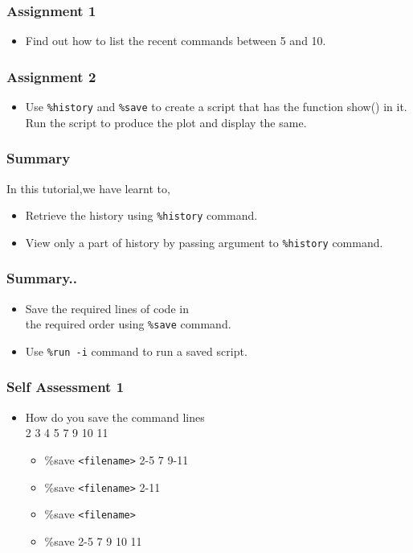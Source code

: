 \documentclass[17pt]{beamer}
\begin{document}
\begin{frame}
  \frametitle{Assignment 1}
   \begin{itemize}
   \item Find out how to list the recent commands between 5 and 10.
   \end{itemize}
\end{frame}
\begin{frame}
  \frametitle{Assignment 2}
  
  \begin{itemize}
  \item Use \texttt{\%history} and \texttt{\%save} to create a script that has the function show() in it. Run the script to produce the plot and display the same.
    \end{itemize}
\end{frame}
\begin{frame}
  \frametitle{Summary}
  In this tutorial,we have learnt to, 
  \begin{itemize}
  \item Retrieve the history using \texttt{\%history} command. 
  \item View only a part of history by passing argument to \texttt{\%history} command. 
    \end{itemize}
\end{frame}

\begin{frame}[fragile]
  \frametitle{Summary..}
  \begin{itemize}
  \item Save the required lines of code in \\ the required order using \texttt{\%save} command. 
  \item Use \texttt{\%run -i} command to run a saved script.
  \end{itemize}
\end{frame}
\begin{frame}[fragile]
	\frametitle{Self Assessment 1}
       \begin{itemize}
           \item How do you save the command lines \\ 2 3 4 5 7 9 10 11
          \begin{itemize}
           \item \%save \texttt {<filename>}  2-5 7 9-11
           \item \%save \texttt {<filename>}  2-11
           \item \%save \texttt {<filename>} 
           \item \%save 2-5 7 9 10 11
           \end{itemize}
        \end{itemize}
\end{frame}
\end{document}
